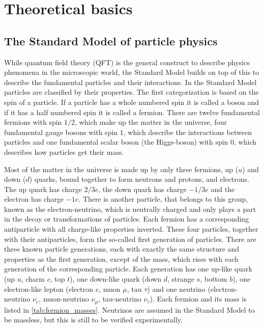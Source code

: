 \chapter{Theoretical basics}


\section{The Standard Model of particle physics}

While quantum field theory (QFT) is the general construct to describe physics phenomena in the microscopic world, the Standard Model builds on top of this to describe the fundamental particles and their interactions.
In the Standard Model particles are classified by their properties. 
The first categorization is based on the spin of a particle. If a particle has a whole numbered spin it is called a boson and if it has a half numbered spin it is called a fermion.
There are twelve fundamental fermions with spin $1/2$, which make up the matter in the universe, four fundamental gauge bosons with spin $1$, which describe the interactions between particles and one fundamental scalar boson (the Higgs-boson) with spin $0$, which describes how particles get their mass.

Most of the matter in the universe is made up by only three fermions, up ($u$) and down ($d$) quarks, bound together to form neutrons and protons, and electrons.
The up quark has charge $2/3e$, the down quark has charge $-1/3e$ and the electron has charge $-1e$.
There is another particle, that belongs to this group, known as the electron-neutrino, which is neutrally charged and only plays a part in the decay or transformations of particles.
Each fermion has a corresponding antiparticle with all charge-like properties inverted.
These four particles, together with their antiparticles, form the so-called first generation of particles.
There are three known particle generations, each with exactly the same structure and properties as the first generation, except of the mass, which rises with each generation of the corresponding particle.
Each generation has one up-like quark (up $u$, charm $c$, top $t$), one down-like quark (down $d$, strange $s$, bottom $b$), one electron-like lepton (electron $e$, muon $\mu$, tau $\tau$) and one neutrino (electron-neutrino $\nu_e$, muon-neutrino $\nu_\mu$, tau-neutrino $\nu_\tau$).
Each fermion and its mass is listed in \autoref{tab:fermion_masses}.
Neutrinos are assumed in the Standard Model to be massless, but this is still to be verified experimentally.

